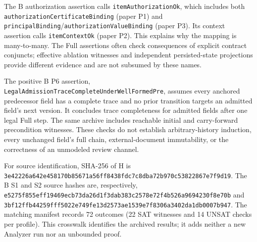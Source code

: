 The \textsf{B} authorization assertion calls \nolinkurl{itemAuthorizationOk},
which includes both \nolinkurl{authorizationCertificateBinding} (paper P1)
and \nolinkurl{principalBinding}/\nolinkurl{authorizationValueBinding} (paper
P3). Its context assertion calls \nolinkurl{itemContextOk} (paper P2).
This explains why the mapping is many-to-many. The Full assertions often
check consequences of explicit contract conjuncts; effective ablation
witnesses and independent persisted-state projections provide different
evidence and are not subsumed by these names.

The positive \textsf{B} P6 assertion,
\nolinkurl{LegalAdmissionTraceCompleteUnderWellFormedPre}, assumes every anchored predecessor field
has a complete trace and no prior transition targets an admitted field's next
version. It concludes trace completeness for admitted fields after one legal
Full step. The same archive includes reachable initial and carry-forward
precondition witnesses. These checks do not establish arbitrary-history
induction, every unchanged field's full chain, external-document immutability,
or the correctness of an unmodeled review channel.

For source identification, SHA-256 of \textsf{H} is
\nolinkurl{3e42226a642e458170b85671a56ff8438fdc7c8dba72b970c53822867e7f9d19}.
The \textsf{B} S1 and S2 source hashes are, respectively,
\nolinkurl{e5275f855eff19469ecb73da26d1f3dab383c2578e72f4b526a9694230f8e70b}
and \nolinkurl{3bf12ffb44259fff5022e749fe13d2573ae1539e7f8306a3402da1db0007b947}.
The matching manifest records 72 outcomes (22 SAT witnesses and 14 UNSAT
checks per profile). This crosswalk identifies the archived results; it adds
neither a new Analyzer run nor an unbounded proof.
